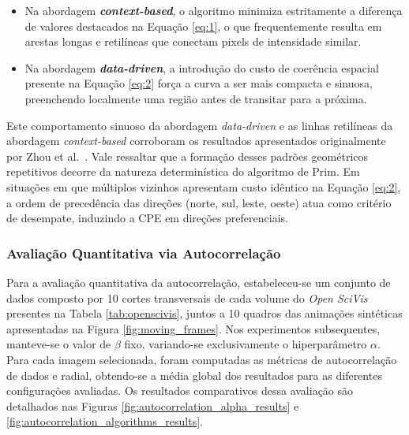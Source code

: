 \documentclass[12pt]{article}
\begin{document}
\begin{itemize}
    \item Na abordagem \textbf{\textit{context-based}}, o algoritmo minimiza estritamente a
    diferença de valores destacados na Equação \ref{eq:1}, o que frequentemente resulta em arestas
    longas e retilíneas que conectam pixels de intensidade similar.
    \item Na abordagem \textbf{\textit{data-driven}}, a introdução do custo de coerência espacial
    presente na Equação \ref{eq:2} força a curva a ser mais compacta e sinuosa, preenchendo localmente uma região
    antes de transitar para a próxima.
\end{itemize}

Este comportamento sinuoso da abordagem \textit{data-driven} e as linhas retilíneas da abordagem \textit{context-based} corroboram
os resultados apresentados originalmente por Zhou et al.~\cite{zhou:20}.
Vale ressaltar que a formação desses padrões geométricos repetitivos decorre da natureza determinística do
algoritmo de Prim. Em situações em que múltiplos vizinhos apresentam custo idêntico na Equação \ref{eq:2}, a ordem de
precedência das direções (norte, sul, leste, oeste) atua como critério de desempate, induzindo a CPE em direções preferenciais.

\FloatBarrier
\subsubsection{Avaliação Quantitativa via Autocorrelação}

Para a avaliação quantitativa da autocorrelação, estabeleceu-se um conjunto de dados composto por 10 cortes
transversais de cada volume do \textit{Open SciVis} presentes na Tabela \ref{tab:openscivis}, juntos a 10 quadros das animações
sintéticas apresentadas na Figura \ref{fig:moving_frames}. Nos experimentos subsequentes, manteve-se o valor de
$\beta$ fixo, variando-se exclusivamente o hiperparâmetro $\alpha$. Para cada imagem selecionada, foram computadas
as métricas de autocorrelação de dados e radial, obtendo-se a média global dos resultados para as diferentes
configurações avaliadas. Os resultados comparativos dessa avaliação são detalhados nas
Figuras \ref{fig:autocorrelation_alpha_results} e \ref{fig:autocorrelation_algorithms_results}. 
\end{document}
